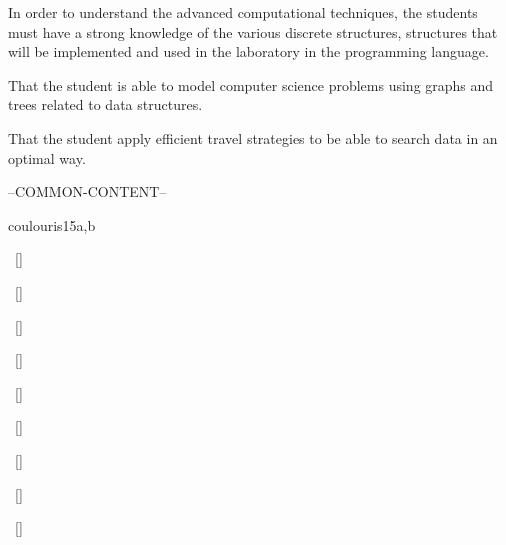 \begin{syllabus}


\begin{justification}
In order to understand the advanced computational techniques, the students must have a strong knowledge of the
various discrete structures, structures that will be implemented and used in the laboratory in the programming language.
\end{justification}

\begin{goals}
\item That the student is able to model computer science problems using graphs and trees related to data structures.
\item That the student apply efficient travel strategies to be able to search data in an optimal way.
\end{goals}

--COMMON-CONTENT--

\begin{unit}{\PDDistributedSystems}{}{coulouris}{15}{a,b}
\begin{topics}%
    \item \PDDistributedSystemsTopicFaults
    \item \PDDistributedSystemsTopicDistributed
    \item \PDDistributedSystemsTopicDistributedSystem
    \item \PDDistributedSystemsTopicDistributedService
    \item \PDDistributedSystemsTopicCore
\end{topics}
\begin{learningoutcomes}%
    \item \PDDistributedSystemsLODistinguishNetwork~[\Familiarity] %
    \item \PDDistributedSystemsLOExplainWhySuch~[\Familiarity] %
    \item \PDDistributedSystemsLOWriteAPerforms~[\Usage] %
    \item \PDDistributedSystemsLOMeasure~[\Usage] %
    \item \PDDistributedSystemsLOExplainWhySystem~[\Familiarity] %
    \item \PDDistributedSystemsLOImplementAForSpell~[\Usage] %
    \item \PDDistributedSystemsLOExplainTheOverhead~[\Familiarity] %
    \item \PDDistributedSystemsLODescribeTheAssociated~[\Familiarity] %
    \item \PDDistributedSystemsLOGiveExamplesFor~[\Usage] %
\end{learningoutcomes}%
\end{unit}


\end{syllabus}
